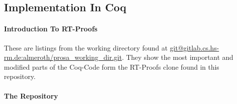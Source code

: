 
\subsection{Implementation In Coq}


\paragraph{Introduction To RT-Proofs}


These are listings from the working directory found at \url{git@gitlab.cs.hs-rm.de:almeroth/prosa_working_dir.git}.
They show the most important and modified parts of the Coq-Code form the RT-Proofs clone found in this repository.




\paragraph{The Repository}

